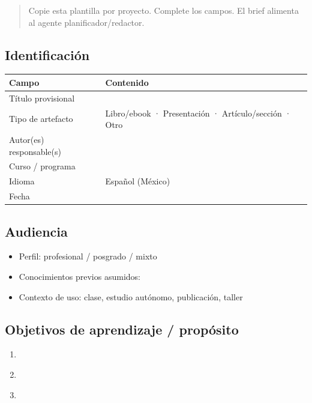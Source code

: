 
\begin{quote}
Copie esta plantilla por proyecto. Complete los campos. El brief alimenta al agente planificador/redactor.
\end{quote}

\subsection*{Identificación}
\begin{tabularx}{\textwidth}{@{}lX@{}}
\toprule
Campo & Contenido \\
\midrule
Título provisional & \underline{\hspace{8cm}} \\
Tipo de artefacto & Libro/ebook · Presentación · Artículo/sección · Otro \\
Autor(es) responsable(s) & \underline{\hspace{8cm}} \\
Curso / programa & \underline{\hspace{8cm}} \\
Idioma & Español (México) \\
Fecha & \underline{\hspace{4cm}} \\
\bottomrule
\end{tabularx}

\subsection*{Audiencia}
\begin{itemize}
\item Perfil: profesional / posgrado / mixto
\item Conocimientos previos asumidos: \underline{\hspace{6cm}}
\item Contexto de uso: clase, estudio autónomo, publicación, taller
\end{itemize}

\subsection*{Objetivos de aprendizaje / propósito}
\begin{enumerate}
\item [Verbo + contenido + condición]
\item \underline{\hspace{8cm}}
\item \underline{\hspace{8cm}}
\end{enumerate}

